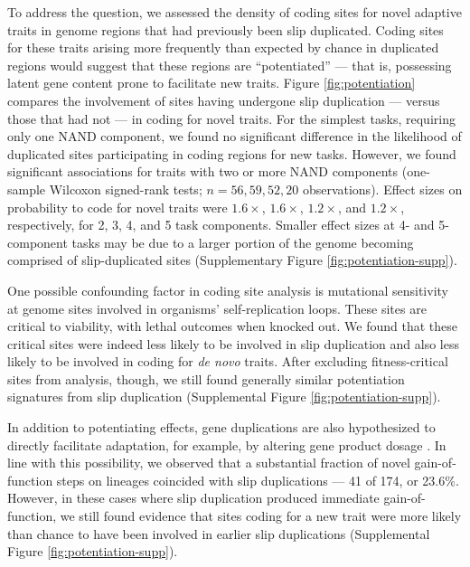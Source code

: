 To address the question, we assessed the density of coding sites for novel adaptive traits in genome regions that had previously been slip duplicated.
Coding sites for these traits arising more frequently than expected by chance in duplicated regions would suggest that these regions are ``potentiated'' --- that is, possessing latent gene content prone to facilitate new traits.
Figure \ref{fig:potentiation} compares the involvement of sites having undergone slip duplication --- versus those that had not --- in coding for novel traits.
For the simplest tasks, requiring only one NAND component, we found no significant difference in the likelihood of duplicated sites participating in coding regions for new tasks.
However, we found significant associations for traits with two or more NAND components (one-sample Wilcoxon signed-rank tests; $n=56,59,52,20$ observations).
Effect sizes on probability to code for novel traits were $1.6\times$, $1.6\times$, $1.2\times$, and $1.2\times$, respectively, for 2, 3, 4, and 5 task components.
Smaller effect sizes at 4- and 5-component tasks may be due to a larger portion of the genome becoming comprised of slip-duplicated sites (Supplementary Figure \ref{fig:potentiation-supp}).

One possible confounding factor in coding site analysis is mutational sensitivity at genome sites involved in organisms' self-replication loops.
These sites are critical to viability, with lethal outcomes when knocked out.
We found that these critical sites were indeed less likely to be involved in slip duplication and also less likely to be involved in coding for \textit{de novo} traits.
After excluding fitness-critical sites from analysis, though, we still found generally similar potentiation signatures from slip duplication (Supplemental Figure \ref{fig:potentiation-supp}).

In addition to potentiating effects, gene duplications are also hypothesized to directly facilitate adaptation, for example, by altering gene product dosage \citep{kondrashov2012gene}.
In line with this possibility, we observed that a substantial fraction of novel gain-of-function steps on lineages coincided with slip duplications --- 41 of 174, or 23.6\%.
However, in these cases where slip duplication produced immediate gain-of-function, we still found evidence that sites coding for a new trait were more likely than chance to have been involved in earlier slip duplications (Supplemental Figure \ref{fig:potentiation-supp}).


